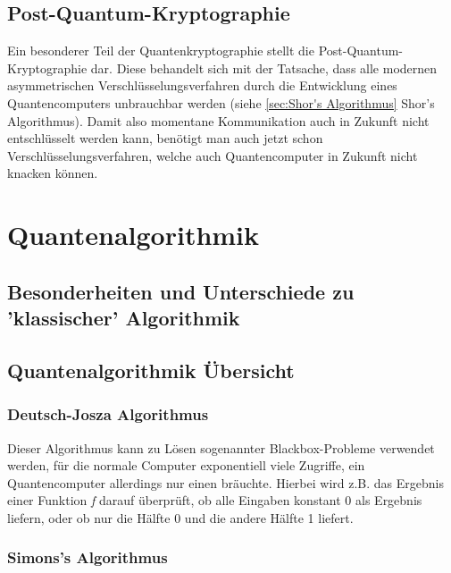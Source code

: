 \subsection{Post-Quantum-Kryptographie}
\label{sec:Post-Quantum-Kryptographie}

Ein besonderer Teil der Quantenkryptographie stellt die Post-Quantum-Kryptographie dar.
Diese behandelt sich mit der Tatsache, dass alle modernen asymmetrischen Verschlüsselungsverfahren durch die Entwicklung eines Quantencomputers unbrauchbar werden (siehe \ref{sec:Shor's Algorithmus} Shor's Algorithmus).
Damit also momentane Kommunikation auch in Zukunft nicht entschlüsselt werden kann, benötigt man auch jetzt schon Verschlüsselungsverfahren, welche auch Quantencomputer in Zukunft nicht knacken können. \cite{postquantumwiki}


\section{Quantenalgorithmik}
\label{sec:Quantenalgorithmik}


\subsection{Besonderheiten und Unterschiede zu 'klassischer' Algorithmik}
\label{sec:Besonderheiten und Unterschiede zu klassischer Algorithmik}


\subsection{Quantenalgorithmik Übersicht}
\label{sec:Quantenalgorithmik Übersicht}


\subsubsection{Deutsch-Josza Algorithmus}

Dieser Algorithmus kann zu Lösen sogenannter Blackbox-Probleme verwendet werden, für die normale Computer exponentiell viele Zugriffe, ein Quantencomputer allerdings nur einen bräuchte.
Hierbei wird z.B. das Ergebnis einer Funktion \textit{f} darauf überprüft, ob alle Eingaben konstant 0 als Ergebnis liefern, oder ob nur die Hälfte 0 und die andere Hälfte 1 liefert. \cite{quantenalgorithmgwiki}


\subsubsection{Simons's Algorithmus}


